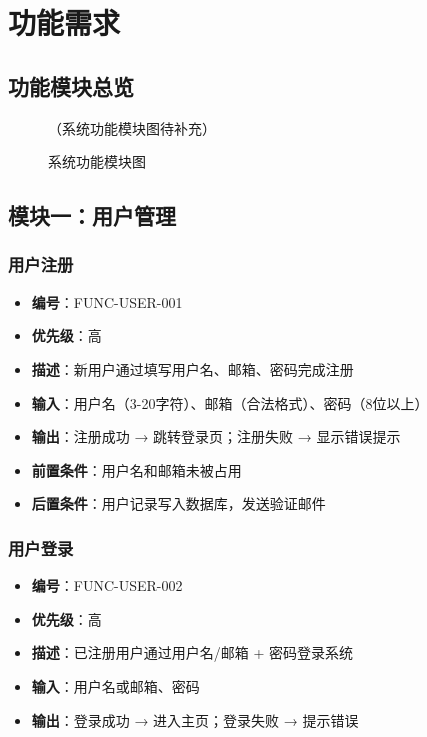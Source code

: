 \documentclass[12pt,a4paper]{ctexart}
\begin{document}
\section{功能需求}
\subsection{功能模块总览}
\begin{figure}[H]
\centering
（系统功能模块图待补充）
\caption{系统功能模块图}
\end{figure}

\subsection{模块一：用户管理}
\subsubsection{用户注册}
\begin{itemize}
    \item \textbf{编号}：FUNC-USER-001
    \item \textbf{优先级}：高
    \item \textbf{描述}：新用户通过填写用户名、邮箱、密码完成注册
    \item \textbf{输入}：用户名（3-20字符）、邮箱（合法格式）、密码（8位以上）
    \item \textbf{输出}：注册成功 → 跳转登录页；注册失败 → 显示错误提示
    \item \textbf{前置条件}：用户名和邮箱未被占用
    \item \textbf{后置条件}：用户记录写入数据库，发送验证邮件
\end{itemize}

\subsubsection{用户登录}
\begin{itemize}
    \item \textbf{编号}：FUNC-USER-002
    \item \textbf{优先级}：高
    \item \textbf{描述}：已注册用户通过用户名/邮箱 + 密码登录系统
    \item \textbf{输入}：用户名或邮箱、密码
    \item \textbf{输出}：登录成功 → 进入主页；登录失败 → 提示错误
\end{itemize}
\end{document}
